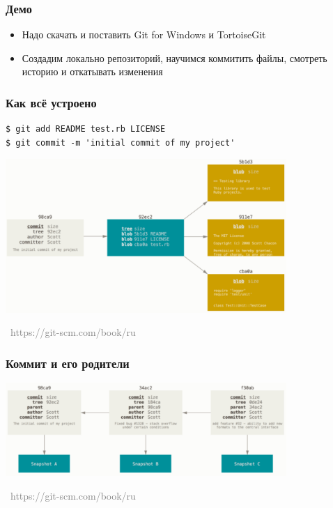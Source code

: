 \documentclass[xetex,mathserif,serif]{beamer}
\newcommand{\attribution}[1] {
    \vspace{-5mm}\begin{flushright}\begin{scriptsize}\textcolor{gray}{\textcopyright\, #1}\end{scriptsize}\end{flushright}
}
\begin{document}
    \begin{frame}
        \frametitle{Демо}
        \begin{itemize}
            \item Надо скачать и поставить Git for Windows и TortoiseGit
            \item Создадим локально репозиторий, научимся коммитить файлы, смотреть историю и откатывать изменения
        \end{itemize}
    \end{frame}

    \begin{frame}[fragile]
        \frametitle{Как всё устроено}
        \begin{verbatim}
$ git add README test.rb LICENSE
$ git commit -m 'initial commit of my project'
        \end{verbatim}
        \begin{center}
            \includegraphics[width=0.8\textwidth]{blobs.png}
            \attribution{https://git-scm.com/book/ru}
        \end{center}
    \end{frame}

    \begin{frame}
        \frametitle{Коммит и его родители}
        \begin{center}
            \includegraphics[width=0.8\textwidth]{commits.png}
            \attribution{https://git-scm.com/book/ru}
        \end{center}
    \end{frame}
\end{document}
